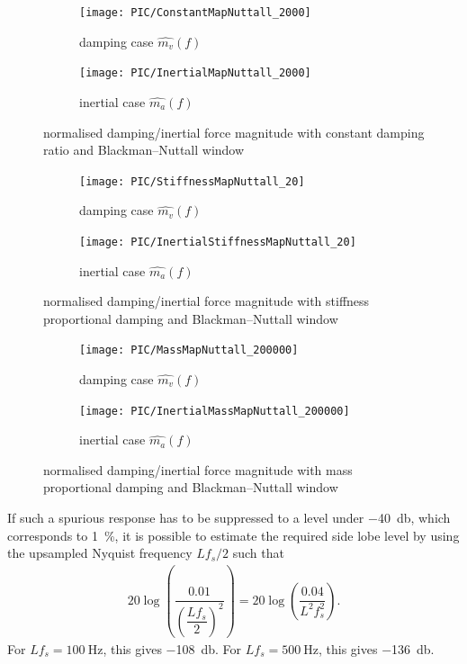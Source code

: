 \begin{figure}[htb!]
\centering
\begin{subfigure}{.48\textwidth}
\texttt{[image: PIC/ConstantMapNuttall\_2000]}
\caption{damping case $\hat{m_v}\left(f\right)$}
\end{subfigure}
\begin{subfigure}{.48\textwidth}
\texttt{[image: PIC/InertialMapNuttall\_2000]}
\caption{inertial case $\hat{m_a}\left(f\right)$}
\end{subfigure}
\caption{normalised damping/inertial force magnitude with constant damping ratio and Blackman--Nuttall window}\label{fig:map_constant_nuttall}
\end{figure}
\begin{figure}[htb!]
\centering
\begin{subfigure}{.48\textwidth}
\texttt{[image: PIC/StiffnessMapNuttall\_20]}
\caption{damping case $\hat{m_v}\left(f\right)$}
\end{subfigure}
\begin{subfigure}{.48\textwidth}
\texttt{[image: PIC/InertialStiffnessMapNuttall\_20]}
\caption{inertial case $\hat{m_a}\left(f\right)$}
\end{subfigure}
\caption{normalised damping/inertial force magnitude with stiffness proportional damping and Blackman--Nuttall window}\label{fig:map_stiffness_nuttall}
\end{figure}
\begin{figure}[htb!]
\centering
\begin{subfigure}{.48\textwidth}
\texttt{[image: PIC/MassMapNuttall\_200000]}
\caption{damping case $\hat{m_v}\left(f\right)$}
\end{subfigure}
\begin{subfigure}{.48\textwidth}
\texttt{[image: PIC/InertialMassMapNuttall\_200000]}
\caption{inertial case $\hat{m_a}\left(f\right)$}
\end{subfigure}
\caption{normalised damping/inertial force magnitude with mass proportional damping and Blackman--Nuttall window}\label{fig:map_mass_nuttall}
\end{figure}

If such a spurious response has to be suppressed to a level under \SI{-40}{\decibel}, which corresponds to \SI{1}{\percent}, it is possible to estimate the required side lobe level by using the upsampled Nyquist frequency $Lf_s/2$ such that
\begin{gather}
20\log\left(\dfrac{0.01}{\left(\dfrac{Lf_s}{2}\right)^2}\right)=20\log\left(\dfrac{0.04}{L^2f_s^2}\right).
\end{gather}
For $Lf_s=\SI{100}{\hertz}$, this gives \SI{-108}{\decibel}. For $Lf_s=\SI{500}{\hertz}$, this gives \SI{-136}{\decibel}.
